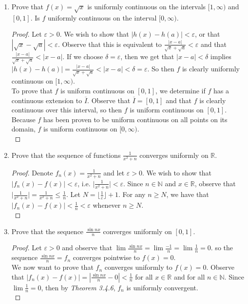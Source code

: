 \documentclass{article}
\begin{document}
\begin{enumerate}
        \item Prove that $f(x) = \sqrt{x}$ is uniformly continuous on the intervals $[1, \infty)$ and $[0,1]$. Is $f$ uniformly continuous on the interval $[0, \infty)$.
        \begin{proof}
             Let $\varepsilon > 0$. We wish to show that $|h(x)-h(a)| < \varepsilon$, or that $|\sqrt{x}-\sqrt{a}| < \varepsilon$. Observe that this is equivalent to $\frac{|x-a|}{\sqrt{x}+\sqrt{a}} < \varepsilon$ and that $\frac{|x-a|}{\sqrt{x}+\sqrt{a}} < |x-a|$. If we choose $\delta = \varepsilon$, then we get that $|x-a| < \delta$ implies $|h(x)-h(a)| = \frac{|x-a|}{\sqrt{x}+\sqrt{a}} < |x-a| < \delta = \varepsilon$. So then $f$ is clearly uniformly continuous on $[1, \infty)$.\\
             To prove that $f$ is uniform continuous on $[0,1]$, we determine if $f$ has a continuous extension to $\overline{I}$. Observe that $\overline{I} = [0,1]$ and that $f$ is clearly continuous over this interval, so then $f$ is uniform continuous on $[0,1]$.\\
             Because $f$ has been proven to be uniform continuous on all points on its domain, $f$ is uniform continuous on $[0, \infty)$.\\
        \end{proof}
        
        \item Prove that the sequence of functions $\frac{1}{x^2+n}$ converges uniformly on $\mathbb{R}$.
        \begin{proof}
            Denote $f_n(x) = \frac{1}{x^2+n}$ and let $\varepsilon > 0$. We wish to show that $|f_n(x)-f(x)| < \varepsilon$, i.e. $\Big|\frac{1}{x^2+n}\Big| < \varepsilon$. Since $n \in \mathbb{N}$ and $x \in \mathbb{R}$, observe that $\Big|\frac{1}{x^2+n}\Big| = \frac{1}{x^2+n} \leq \frac{1}{n}$. Let $N = \lfloor \frac{1}{\varepsilon} \rfloor + 1$. For any $n \geq N$, we have that $|f_n(x)-f(x)| < \frac{1}{n} < \varepsilon$ whenever $n \geq N$.\\
        \end{proof}
        
        \item Prove that the sequence $\frac{\sin{nx}}{n}$ converges uniformly on $[0,1]$.
        \begin{proof}
            Let $\varepsilon > 0$ and observe that $\lim \frac{\sin{nx}}{n} = \lim \frac{-1}{n} = \lim \frac{1}{n} = 0$. so the sequence $\frac{\sin{nx}}{n} = f_n$ converges pointwise to $f(x) = 0$.\\
            We now want to prove that $f_n$ converges uniformly to $f(x) = 0$. Observe that $|f_n(x)-f(x)| = |\frac{\sin{nx}}{n}-0| < \frac{1}{n}$ for all $x \in \mathbb{R}$ and for all $n \in \mathbb{N}$. Since $\lim \frac{1}{n} = 0$, then by \textit{Theorem 3.4.6}, $f_n$ is uniformly convergent.\\
        \end{proof}
        

\end{enumerate}
\end{document}
